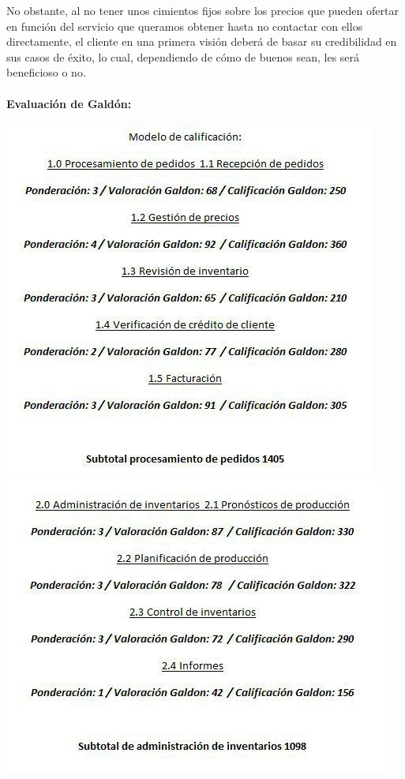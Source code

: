 \documentclass{article}
\begin{document}
No obstante, al no tener unos cimientos fijos sobre los precios que pueden ofertar en función del servicio que queramos obtener hasta no contactar con ellos directamente, el cliente en una primera visión deberá de basar su credibilidad en sus casos de éxito, lo cual, dependiendo de cómo de buenos sean, les será beneficioso o no. 

\paragraph{Evaluación de Galdón:\\}

\begin{flushleft}
	\includegraphics[scale=0.8]{imagenes/Galdon1.jpg}
	\includegraphics[scale=0.8]{imagenes/Galdon2.jpg}

\end{flushleft}
\end{document}
